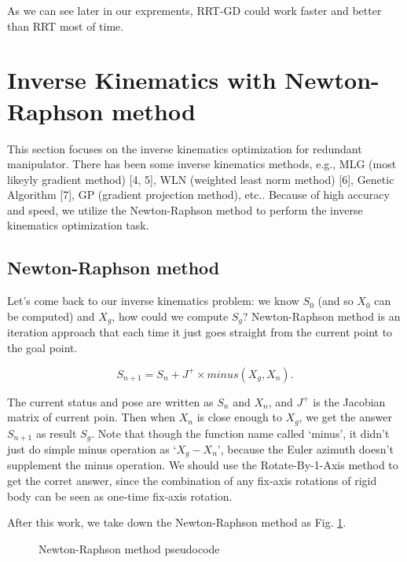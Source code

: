 \documentclass[letterpaper, 10 pt, conference]{ieeeconf}  %
\begin{document}
As we can see later in our exprements, RRT-GD could work faster and better than RRT most of time.

\section{Inverse Kinematics with Newton-Raphson method}

This section focuses on the inverse kinematics optimization for redundant manipulator. There has been some inverse kinematics methods, e.g., MLG (most likeyly gradient method) [4, 5], WLN (weighted least norm method) [6], Genetic Algorithm [7], GP (gradient projection method), etc.. Because of high accuracy and speed, we utilize the Newton-Raphson method to perform the inverse kinematics optimization task.


\subsection{Newton-Raphson method}

Let's come back to our inverse kinematics problem: we know $S_{0}$ (and so $X_{0}$ can be computed) and $X_{g}$, how could we compute $S_{g}$? Newton-Raphson method is an iteration approach that each time it just goes straight from the current point to the goal point.

\begin{equation}\label{Eq_NR}
S_{n+1} = S_{n} + J^{+} \times minus(X_{g}, X_{n}).
\end{equation}

The current status and pose are written as $S_{n}$ and $X_{n}$, and $J^{+}$ is the Jacobian matrix of current poin. Then when $X_{n}$ is close enough to $X_{g}$, we get the answer $S_{n+1}$ as result $S_{g}$. Note that though the function name called `minus', it didn't just do simple minus operation as `$X_{g} - X_{n}$', because the Euler azimuth doesn't supplement the minus operation. We should use the Rotate-By-1-Axis method to get the corret answer, since the combination of any fix-axis rotations of rigid body can be seen as one-time fix-axis rotation.

After this work, we take down the Newton-Raphson method as Fig. \ref{fig_newton}.

\begin{figure}[thpb]
      \centering
      \caption{Newton-Raphson method pseudocode}
      \label{fig_newton}
\end{figure}
\end{document}
